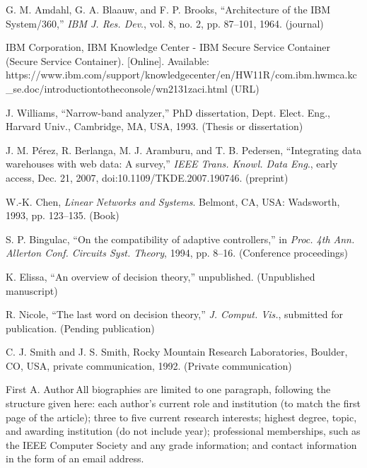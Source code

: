 \documentclass{IEEEcsmag}
\begin{document}
\def\refname{REFERENCES}

\begin{thebibliography}{1}

G. M. Amdahl, G. A. Blaauw, and F. P. Brooks, ``Architecture of the IBM System/360,'' {\it IBM J. Res. Dev}., vol. 8, no. 2, pp. 87--101, 1964. (journal)

IBM Corporation, IBM Knowledge Center - IBM Secure Service Container (Secure Service Container). [Online]. Available: {https://www.ibm.com/support/\break knowledgecenter/en/HW11R/com.ibm.hwmca.kc\_se.doc/\break introductiontotheconsole/wn2131zaci.html} (URL)

J. Williams, ``Narrow-band analyzer,'' PhD dissertation, Dept.  Elect. Eng., Harvard Univ., Cambridge, MA, USA, 1993. (Thesis or dissertation)

J. M. P\'erez, R. Berlanga, M. J. Aramburu, and T. B. Pedersen, ``Integrating data warehouses with web data: A survey,'' {\it IEEE Trans. Knowl. Data Eng}., early access, Dec. 21, 2007, doi:10.1109/TKDE.2007.190746. (preprint)

W.-K. Chen, {\it Linear Networks and Systems}. Belmont, CA, USA: Wadsworth,  1993, pp. 123--135. (Book)

S. P. Bingulac, ``On the compatibility of adaptive controllers,'' in {\it Proc. 4th Ann. Allerton Conf. Circuits Syst. Theory}, 1994,  pp. 8--16. (Conference proceedings)

K. Elissa, ``An overview of decision theory,'' unpublished. (Unpublished manuscript)

R. Nicole, ``The last word on decision theory,'' {\it J. Comput. Vis.}, submitted for publication. (Pending publication)

C. J. Smith and J. S. Smith, Rocky Mountain Research Laboratories, Boulder, CO, USA, private communication, 1992. (Private communication)
\end{thebibliography}\vspace*{-8pt}


\begin{IEEEbiography}{First A. Author}{\,}All biographies are limited to one paragraph, following the structure given here: each author's current role and institution (to match the first page of the article); three to  five current research interests; highest degree, topic, and awarding institution (do not include year); professional memberships, such as the IEEE Computer Society and any grade information; and contact information in the form of an email address.\vadjust{\vfill\pagebreak}
\end{IEEEbiography}
\end{document}
